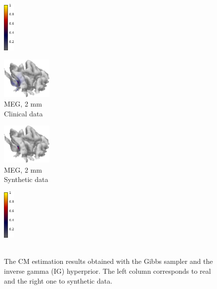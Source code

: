 \documentclass[5p]{elsarticle}
\begin{document}
\begin{figure}[h!]
\begin{footnotesize}
\begin{center}
\begin{minipage}{3cm}
\begin{center}
\end{center}\end{minipage} \begin{minipage}{0.5cm} \begin{center}
\includegraphics[height=2.5cm]{colorbar.png} \\ \null
\end{center}
\end{minipage} \vskip0.2cm
\begin{minipage}{3cm} \begin{center}
\includegraphics[height=2.0cm]{CM_MEG_IG_2mm.png}\\ MEG, 2 mm \\ Clinical data 
\end{center}\end{minipage}
\begin{minipage}{3cm} \begin{center}
\includegraphics[height=2.0cm]{CM_MEG_IG_2mm_syntheticdata.png} \\ MEG, 2 mm \\ Synthetic data
\end{center}\end{minipage}
\begin{minipage}{0.5cm} \begin{center}
\includegraphics[height=2.5cm]{colorbar.png} \\ \mbox{} \\ \mbox{}
\end{center}
\end{minipage}
\end{center}
\end{footnotesize}
\caption{The CM estimation results obtained with the Gibbs sampler and the inverse gamma (IG) hyperprior. The left column corresponds to real and the right one to synthetic data.}
\label{fig:somatosensory_results_2} 
\end{figure}
\end{document}
